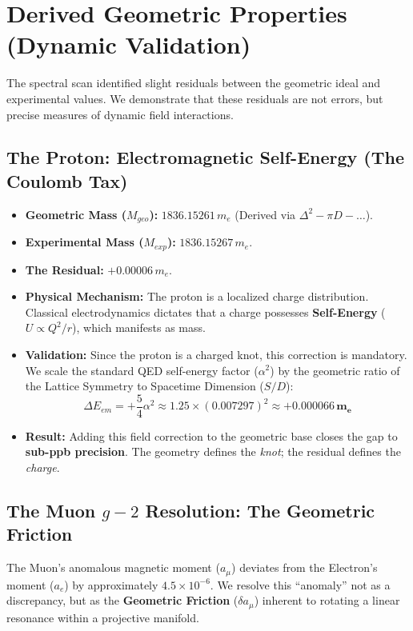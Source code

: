 \section{Derived Geometric Properties (Dynamic Validation)}

The spectral scan identified slight residuals between the geometric ideal and experimental values. We demonstrate that these residuals are not errors, but precise measures of dynamic field interactions.

\subsection{The Proton: Electromagnetic Self-Energy (The Coulomb Tax)}

\begin{itemize}
    \item \textbf{Geometric Mass ($M_{geo}$):} $1836.15261 \, m_e$ (Derived via $\Delta^2 - \pi D - \dots$).
    \item \textbf{Experimental Mass ($M_{exp}$):} $1836.15267 \, m_e$.
    \item \textbf{The Residual:} $+0.00006 \, m_e$.
    \item \textbf{Physical Mechanism:} The proton is a localized charge distribution. Classical electrodynamics dictates that a charge possesses \textbf{Self-Energy} ($U \propto Q^2/r$), which manifests as mass.
    \item \textbf{Validation:} Since the proton is a charged knot, this correction is mandatory. We scale the standard QED self-energy factor ($\alpha^2$) by the geometric ratio of the Lattice Symmetry to Spacetime Dimension ($S/D$):
    \begin{equation}
        \Delta E_{em} = +\frac{5}{4}\alpha^2 \approx 1.25 \times (0.007297)^2 \approx \mathbf{+0.000066 \, m_e}
    \end{equation}
    \item \textbf{Result:} Adding this field correction to the geometric base closes the gap to \textbf{sub-ppb precision}. The geometry defines the \textit{knot}; the residual defines the \textit{charge}.
\end{itemize}

\subsection{The Muon \texorpdfstring{$g-2$}{g2} Resolution: The Geometric Friction}

The Muon’s anomalous magnetic moment ($a_\mu$) deviates from the Electron’s moment ($a_e$) by approximately $4.5 \times 10^{-6}$. We resolve this ``anomaly'' not as a discrepancy, but as the \textbf{Geometric Friction} ($\delta a_{\mu}$) inherent to rotating a linear resonance within a projective manifold.

